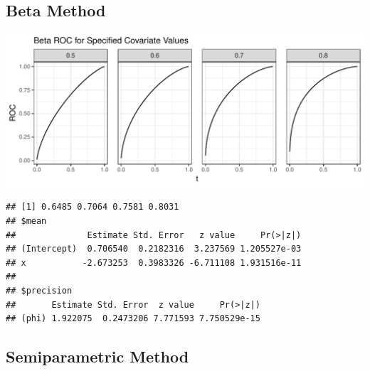 \documentclass[10pt, title page]{article}\usepackage[]{graphicx}\usepackage[]{color}
\makeatletter
\def\maxwidth{ %
  \ifdim\Gin@nat@width>\linewidth
    \linewidth
  \else
    \Gin@nat@width
  \fi
}
\newenvironment{kframe}{%
 \def\at@end@of@kframe{}%
 \ifinner\ifhmode%
  \def\at@end@of@kframe{\end{minipage}}%
  \begin{minipage}{\columnwidth}%
 \fi\fi%
 \def\FrameCommand##1{\hskip\@totalleftmargin \hskip-\fboxsep
 \colorbox{shadecolor}{##1}\hskip-\fboxsep
     \hskip-\linewidth \hskip-\@totalleftmargin \hskip\columnwidth}%
 \MakeFramed {\advance\hsize-\width
   \@totalleftmargin\z@ \linewidth\hsize
   \@setminipage}}%
 {\par\unskip\endMakeFramed%
 \at@end@of@kframe}
\newenvironment{knitrout}{}{} %
\makeatother
\begin{document}
\newpage
\subsection{Beta Method}



\begin{knitrout}
\color{fgcolor}\begin{kframe}


{\ttfamily\noindent\color{warningcolor}{\#\# Warning: `panel.margin` is deprecated. Please use `panel.spacing` property instead}}\end{kframe}
\includegraphics[width=\maxwidth]{figure/unnamed-chunk-4-1} 
\begin{kframe}\begin{verbatim}
## [1] 0.6485 0.7064 0.7581 0.8031
## $mean
##              Estimate Std. Error   z value     Pr(>|z|)
## (Intercept)  0.706540  0.2182316  3.237569 1.205527e-03
## x           -2.673253  0.3983326 -6.711108 1.931516e-11
## 
## $precision
##       Estimate Std. Error  z value     Pr(>|z|)
## (phi) 1.922075  0.2473206 7.771593 7.750529e-15
\end{verbatim}
\end{kframe}
\end{knitrout}


\newpage
\subsection{Semiparametric Method}
\end{document}
